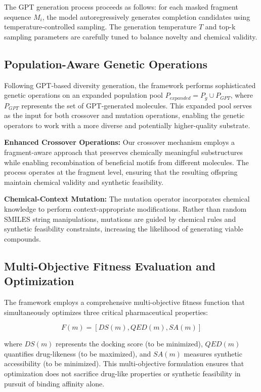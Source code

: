 \documentclass[lettersize,journal]{IEEEtran}
\begin{document}
The GPT generation process proceeds as follows: for each masked fragment sequence $M_i$, the model autoregressively generates completion candidates using temperature-controlled sampling. The generation temperature $T$ and top-k sampling parameters are carefully tuned to balance novelty and chemical validity.

\subsection{Population-Aware Genetic Operations}

Following GPT-based diversity generation, the framework performs sophisticated genetic operations on an expanded population pool $P_{expanded} = P_g \cup P_{GPT}$, where $P_{GPT}$ represents the set of GPT-generated molecules. This expanded pool serves as the input for both crossover and mutation operations, enabling the genetic operators to work with a more diverse and potentially higher-quality substrate.

\noindent \textbf{Enhanced Crossover Operations:} Our crossover mechanism employs a fragment-aware approach that preserves chemically meaningful substructures while enabling recombination of beneficial motifs from different molecules. The process operates at the fragment level, ensuring that the resulting offspring maintain chemical validity and synthetic feasibility.

\noindent \textbf{Chemical-Context Mutation:} The mutation operator incorporates chemical knowledge to perform context-appropriate modifications. Rather than random SMILES string manipulations, mutations are guided by chemical rules and synthetic feasibility constraints, increasing the likelihood of generating viable compounds.

\subsection{Multi-Objective Fitness Evaluation and Optimization}

The framework employs a comprehensive multi-objective fitness function that simultaneously optimizes three critical pharmaceutical properties:

\begin{equation}
F(m) = [DS(m), QED(m), SA(m)]
\end{equation}

where $DS(m)$ represents the docking score (to be minimized), $QED(m)$ quantifies drug-likeness (to be maximized), and $SA(m)$ measures synthetic accessibility (to be minimized). This multi-objective formulation ensures that optimization does not sacrifice drug-like properties or synthetic feasibility in pursuit of binding affinity alone.
\end{document}
